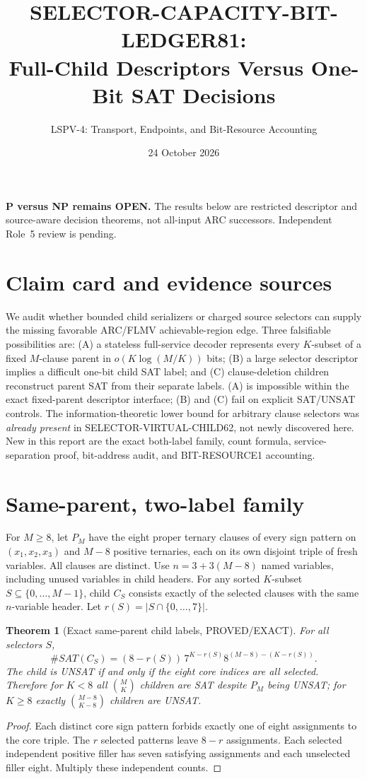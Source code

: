 \documentclass[11pt]{article}
\title{SELECTOR-CAPACITY-BIT-LEDGER81:\\Full-Child Descriptors Versus One-Bit SAT Decisions}
\author{LSPV-4: Transport, Endpoints, and Bit-Resource Accounting}
\date{24 October 2026}
\newtheorem{theorem}{Theorem}
\begin{document}
\maketitle
\noindent\textbf{P versus NP remains OPEN.} The results below are restricted descriptor and source-aware decision theorems, not all-input ARC successors. Independent Role~5 review is pending.
\section{Claim card and evidence sources}
We audit whether bounded child serializers or charged source selectors can supply the missing favorable ARC/FLMV achievable-region edge. Three falsifiable possibilities are: (A) a stateless full-service decoder represents every $K$-subset of a fixed $M$-clause parent in $o(K\log(M/K))$ bits; (B) a large selector descriptor implies a difficult one-bit child SAT label; and (C) clause-deletion children reconstruct parent SAT from their separate labels. (A) is impossible within the exact fixed-parent descriptor interface; (B) and (C) fail on explicit SAT/UNSAT controls. The information-theoretic lower bound for arbitrary clause selectors was \emph{already present} in SELECTOR-VIRTUAL-CHILD62, not newly discovered here. New in this report are the exact both-label family, count formula, service-separation proof, bit-address audit, and BIT-RESOURCE1 accounting.
\section{Same-parent, two-label family}
For $M\ge8$, let $P_M$ have the eight proper ternary clauses of every sign pattern on $(x_1,x_2,x_3)$ and $M-8$ positive ternaries, each on its own disjoint triple of fresh variables. All clauses are distinct. Use $n=3+3(M-8)$ named variables, including unused variables in child headers. For any sorted $K$-subset $S\subseteq\{0,\ldots,M-1\}$, child $C_S$ consists exactly of the selected clauses with the same $n$-variable header. Let $r(S)=|S\cap\{0,\ldots,7\}|$.
\begin{theorem}[Exact same-parent child labels, PROVED/EXACT]
For all selectors $S$,
\[
 \#SAT(C_S)=(8-r(S))\,7^{K-r(S)}8^{(M-8)-(K-r(S))}.
\]
The child is UNSAT if and only if the eight core indices are all selected. Therefore for $K<8$ all $\binom MK$ children are SAT despite $P_M$ being UNSAT; for $K\ge8$ exactly $\binom{M-8}{K-8}$ children are UNSAT.
\end{theorem}
\begin{proof}
Each distinct core sign pattern forbids exactly one of eight assignments to the core triple. The $r$ selected patterns leave $8-r$ assignments. Each selected independent positive filler has seven satisfying assignments and each unselected filler eight. Multiply these independent counts.
\end{proof}
\end{document}
